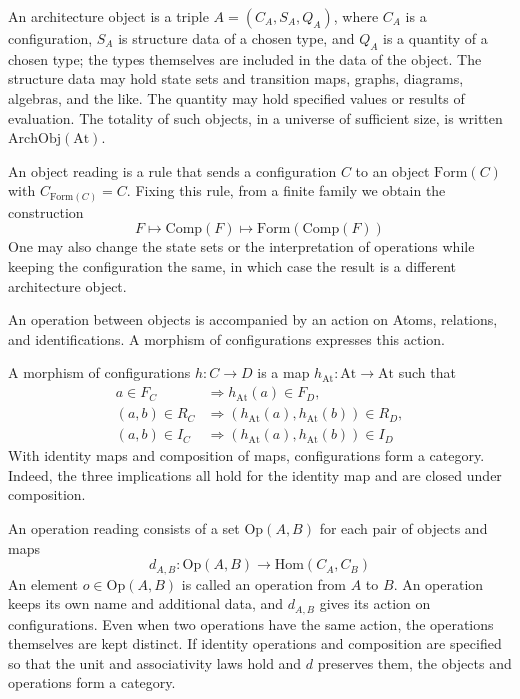 \begin{definition}\label{def:1.6}

An architecture object is a triple $A=(C_A,S_A,Q_A)$, where $C_A$ is a
configuration, $S_A$ is structure data of a chosen type, and $Q_A$ is a quantity
of a chosen type; the types themselves are included in the data of the object.
The structure data may hold state sets and transition maps, graphs, diagrams,
algebras, and the like. The quantity may hold specified values or results of
evaluation. The totality of such objects, in a universe of sufficient size, is
written $\mathrm{ArchObj}(\mathrm{At})$.

An object reading is a rule that sends a configuration $C$ to an object
$\mathrm{Form}(C)$ with $C_{\mathrm{Form}(C)}=C$.
Fixing this rule, from a finite family we obtain the construction
\[
F\longmapsto \mathrm{Comp}(F)\longmapsto
\mathrm{Form}(\mathrm{Comp}(F))
\]
One may also change the state sets or the interpretation of operations while
keeping the configuration the same, in which case the result is a different
architecture object.

\end{definition}

\begin{definition}\label{def:1.7}

An operation between objects is accompanied by an action on Atoms, relations, and
identifications. A morphism of configurations expresses this action.

A morphism of configurations $h:C\to D$ is a map
$h_{\mathrm{At}}:\mathrm{At}\to\mathrm{At}$ such that
\[
\begin{aligned}
a\in F_C&\Longrightarrow h_{\mathrm{At}}(a)\in F_D,\\
(a,b)\in R_C&\Longrightarrow
(h_{\mathrm{At}}(a),h_{\mathrm{At}}(b))\in R_D,\\
(a,b)\in I_C&\Longrightarrow
(h_{\mathrm{At}}(a),h_{\mathrm{At}}(b))\in I_D
\end{aligned}
\]
With identity maps and composition of maps, configurations form a category.
Indeed, the three implications all hold for the identity map and are closed under
composition.

An operation reading consists of a set $\mathrm{Op}(A,B)$ for each pair of
objects and maps
\[
d_{A,B}:\mathrm{Op}(A,B)\longrightarrow
\mathrm{Hom}(C_A,C_B)
\]
An element $o\in\mathrm{Op}(A,B)$ is called an operation from $A$ to $B$.
An operation keeps its own name and additional data, and $d_{A,B}$ gives its
action on configurations. Even when two operations have the same action, the
operations themselves are kept distinct.
If identity operations and composition are specified so that the unit and
associativity laws hold and $d$ preserves them, the objects and operations form a
category.

\end{definition}

